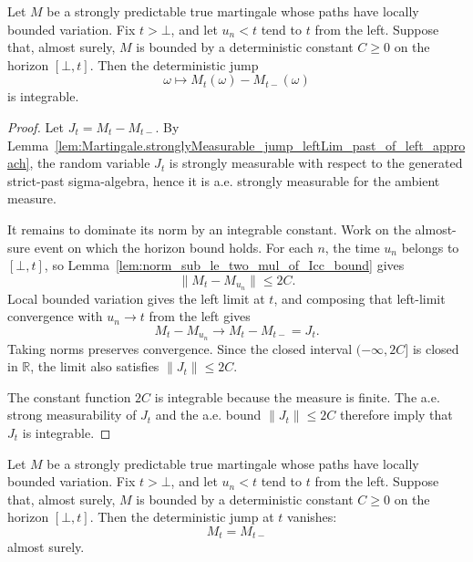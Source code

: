\begin{lemma}\label{lem:Martingale.integrable_jump_leftLim_of_left_approach_of_bound}
Let \(M\) be a strongly predictable true martingale whose paths have locally
bounded variation.  Fix \(t>\bot\), and let \(u_n<t\) tend to \(t\) from the
left.  Suppose that, almost surely, \(M\) is bounded by a deterministic
constant \(C\ge0\) on the horizon \([\bot,t]\).  Then the deterministic jump
\[
  \omega\longmapsto M_t(\omega)-M_{t-}(\omega)
\]
is integrable.
\end{lemma}

\begin{proof}
Let \(J_t=M_t-M_{t-}\).  By
Lemma~\ref{lem:Martingale.stronglyMeasurable_jump_leftLim_past_of_left_approach},
the random variable \(J_t\) is strongly measurable with respect to the
generated strict-past sigma-algebra, hence it is a.e. strongly measurable for
the ambient measure.

It remains to dominate its norm by an integrable constant.  Work on the
almost-sure event on which the horizon bound holds.  For each \(n\), the time
\(u_n\) belongs to \([\bot,t]\), so
Lemma~\ref{lem:norm_sub_le_two_mul_of_Icc_bound} gives
\[
  \|M_t-M_{u_n}\|\le 2C .
\]
Local bounded variation gives the left limit at \(t\), and composing that
left-limit convergence with \(u_n\to t\) from the left gives
\[
  M_t-M_{u_n}\longrightarrow M_t-M_{t-}=J_t .
\]
Taking norms preserves convergence.  Since the closed interval
\((-\infty,2C]\) is closed in \(\mathbb R\), the limit also satisfies
\(\|J_t\|\le 2C\).

The constant function \(2C\) is integrable because the measure is finite.
The a.e. strong measurability of \(J_t\) and the a.e. bound
\(\|J_t\|\le 2C\) therefore imply that \(J_t\) is integrable.
\end{proof}

\begin{lemma}\label{lem:Martingale.ae_eq_leftLim_of_left_approach_past_setIntegral_zero_of_bound_no_integrability}
Let \(M\) be a strongly predictable true martingale whose paths have locally
bounded variation.  Fix \(t>\bot\), and let \(u_n<t\) tend to \(t\) from the
left.  Suppose that, almost surely, \(M\) is bounded by a deterministic
constant \(C\ge0\) on the horizon \([\bot,t]\).  Then the deterministic jump
at \(t\) vanishes:
\[
  M_t=M_{t-}
\]
almost surely.
\end{lemma}

